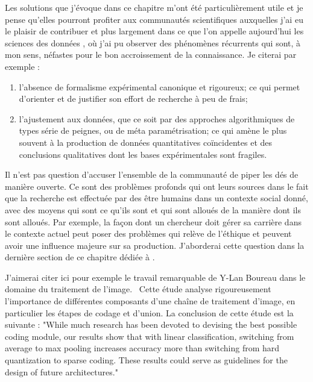 Les solutions que j'évoque dans ce chapitre m'ont été particulièrement utile et je pense qu'elles pourront profiter aux communautés scientifiques auxquelles j'ai eu le plaisir de contribuer et plus largement dans ce que l'on appelle aujourd'hui \og les sciences des données \fg, où j'ai pu observer des phénomènes récurrents qui sont, à mon sens, néfastes pour le bon accroissement de la connaissance. Je citerai par exemple :
\begin{enumerate}
  \item l'absence de formalisme expérimental canonique et rigoureux; ce qui permet d'orienter et de justifier son effort de recherche à peu de frais;
  \item l'ajustement aux données, que ce soit par des approches algorithmiques de types série de peignes, ou de méta paramétrisation; ce qui amène le plus souvent à la production de données quantitatives coïncidentes et des conclusions qualitatives dont les bases expérimentales sont fragiles.
\end{enumerate}

Il n'est pas question d'accuser l'ensemble de la communauté de \og piper les dés \fg de manière ouverte. Ce sont des problèmes profonds qui ont leurs sources dans le fait que la recherche est effectuée par des être humains dans un contexte social donné, avec des moyens qui sont ce qu'ils sont et qui sont alloués de la manière dont ils sont alloués. Par exemple, la façon dont un chercheur doit gérer sa carrière dans le contexte actuel peut poser des problèmes qui relève de l'éthique et peuvent avoir une influence majeure sur sa production. J'aborderai cette question dans la dernière section de ce chapitre dédiée à .


J'aimerai citer ici pour exemple le travail remarquable de Y-Lan Boureau dans le domaine du traitement de l'image.~\cite{boureau2010learning} Cette étude analyse rigoureusement l'importance de différentes composants d'une chaîne de traitement d'image, en particulier les étapes de codage et d'union. La conclusion de cette étude est la suivante :  "While much research has been devoted to devising
the best possible coding module, our results show that with
linear classification, switching from average to max pooling
increases accuracy more than switching from hard quantization to sparse coding. These results could serve as guidelines for the design of future architectures."

